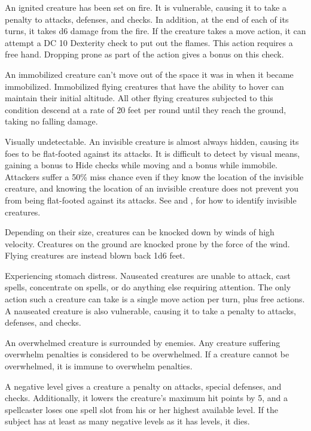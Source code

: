  An ignited creature has been set on fire. It is vulnerable, causing it to take a  penalty to attacks, defenses, and checks. In addition, at the end of each of its turns, it takes d6 damage from the fire. If the creature takes a move action, it can attempt a DC 10 Dexterity check to put out the flames. This action requires a free hand. Dropping prone as part of the action gives a  bonus on this check.

 An immobilized creature can't move out of the space it was in when it became immobilized. Immobilized flying creatures that have the ability to hover can maintain their initial altitude. All other flying creatures subjected to this condition descend at a rate of 20 feet per round until they reach the ground, taking no falling damage.

 Visually undetectable. An invisible creature is almost always hidden, causing its foes to be flat-footed against its attacks. It is difficult to detect by visual means, gaining a  bonus to Hide checks while moving and a  bonus while immobile. Attackers suffer a 50\% miss chance even if they know the location of the invisible creature, and knowing the location of an invisible creature does not prevent you from being flat-footed against its attacks. See  and , for how to identify invisible creatures.

 Depending on their size, creatures can be knocked down by winds of high velocity. Creatures on the ground are knocked prone by the force of the wind. Flying creatures are instead blown back 1d6  feet.

 Experiencing stomach distress. Nauseated creatures are unable to attack, cast spells, concentrate on spells, or do anything else requiring attention. The only action such a creature can take is a single move action per turn, plus free actions. A nauseated creature is also vulnerable, causing it to take a  penalty to attacks, defenses, and checks.

 An overwhelmed creature is surrounded by enemies. Any creature suffering overwhelm penalties is considered to be overwhelmed. If a creature cannot be overwhelmed, it is immune to overwhelm penalties.

 A negative level gives a creature a  penalty on attacks, special defenses, and checks. Additionally, it lowers the creature's maximum hit points by 5, and a spellcaster loses one spell slot from his or her highest available level. If the subject has at least as many negative levels as it has levels, it dies.

